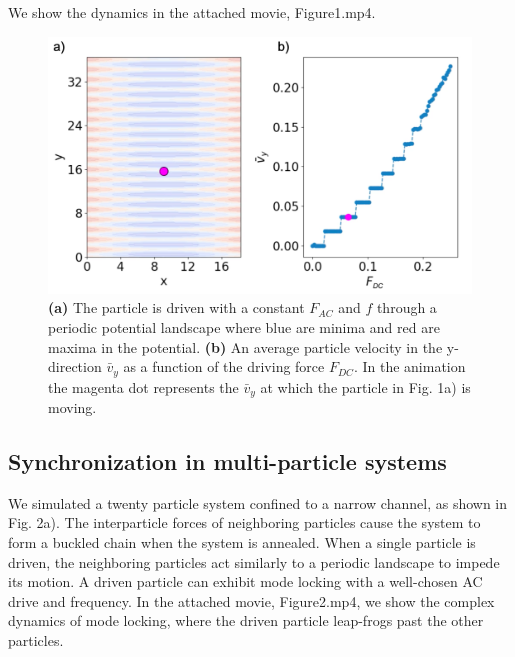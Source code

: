 \documentclass[prb,preprint]{revtex4}
\begin{document}
We show the dynamics 
in the attached movie, Figure1.mp4.



\begin{center}
\begin{figure}[h!]
\centering
\includegraphics[scale=.25]{single}
\caption{\textbf{(a)} The particle is driven with a constant $F_{AC}$ and $f$ through a periodic potential landscape where blue are minima and red are maxima in the potential. \textbf{(b)} An average particle velocity in the y-direction $\bar{v}_{y}$ as a function of the driving force $F_{DC}$. In the animation the magenta dot represents the $\bar{v}_{y}$ at which the particle in Fig. 1a) is moving.}
\label{fig:1}
\end{figure}
\end{center}

\subsection{Synchronization in multi-particle systems}
\label{sec:sync}

We simulated a twenty particle system confined to a narrow channel, as shown in Fig. 2a). The interparticle forces of neighboring particles cause the system to form a buckled chain when the system is annealed. When a single particle is driven, the neighboring particles act similarly to a periodic landscape to impede its motion. A driven particle can exhibit mode locking with a well-chosen AC drive and frequency. In the attached movie, Figure2.mp4, we show the complex dynamics of mode locking, where the driven particle leap-frogs past the other particles. 
\end{document}
